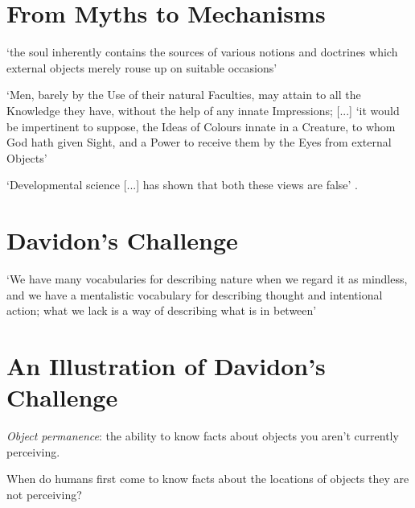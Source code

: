 \documentclass[12pt]{extarticle}
\begin{document}
\begin{multicols}{3}
\section{From Myths to Mechanisms}
 
‘the soul inherently contains the sources of various notions and doctrines which external objects merely rouse up on suitable occasions’
\citep[p.\ 48]{Leibniz:1996bl}
 
‘Men, barely by the Use of their natural Faculties, may attain to all the Knowledge they have, without the help of any innate Impressions; [...]
‘it would be impertinent to suppose, the Ideas of Colours innate in a Creature, to whom God hath given Sight, and a Power to receive them by the Eyes from external Objects’
\citep[p.\ 48]{Locke:1975qo}
 
‘Developmental science [...] has shown that both these views are false’
\citep[p.\ 89]{Spelke:2007hb}.
 
 
 
\section{Davidon's Challenge}
 
‘We have many vocabularies for describing nature when we regard it as mindless, and we have a mentalistic vocabulary for describing thought and intentional action; what we lack is a way of describing what is in between’ \citep[p.\ 11]{Davidson:1999ju}
 
 
 
\section{An Illustration of Davidon's Challenge}
 
\textit{Object permanence}: the ability to know facts about objects you aren't currently perceiving.
 
When do humans first come to know facts about the locations of objects they are not perceiving?
 

\end{multicols}
\end{document}
